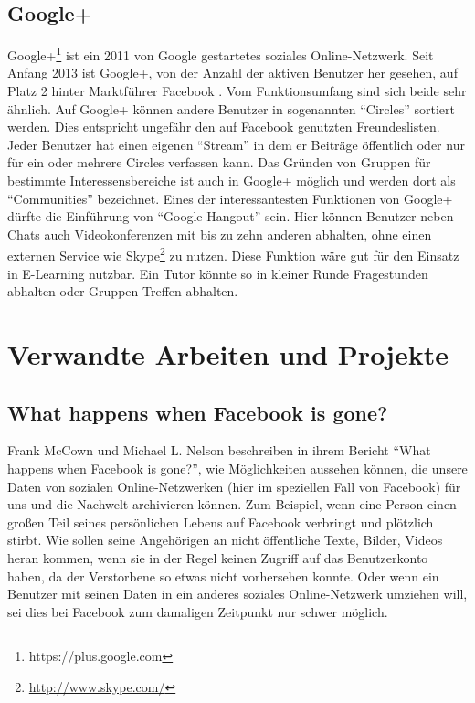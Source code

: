 
\subsection{Google+} %
\label{sub:google_plus}

Google+\footnote{https://plus.google.com} ist ein 2011 von Google gestartetes soziales Online-Netzwerk. Seit Anfang 2013 ist Google+, von der Anzahl der aktiven Benutzer her gesehen, auf Platz 2 hinter Marktführer Facebook \cite{Thomas2013}. Vom Funktionsumfang sind sich beide sehr ähnlich. Auf Google+ können andere Benutzer in sogenannten \enquote{Circles} sortiert werden. Dies entspricht ungefähr den auf Facebook genutzten Freundeslisten. Jeder Benutzer hat einen eigenen \enquote{Stream} in dem er Beiträge öffentlich oder nur für ein oder mehrere Circles verfassen kann. Das Gründen von Gruppen für bestimmte Interessensbereiche ist auch in Google+ möglich und werden dort als \enquote{Communities} bezeichnet. Eines der interessantesten Funktionen von Google+ dürfte die Einführung von \enquote{Google Hangout} sein. Hier können Benutzer neben Chats auch Videokonferenzen mit bis zu zehn anderen abhalten, ohne einen externen Service wie Skype\footnote{\url{http://www.skype.com/}} zu nutzen. Diese Funktion wäre gut für den Einsatz in E-Learning nutzbar. Ein Tutor könnte so in kleiner Runde Fragestunden abhalten oder Gruppen Treffen abhalten.



\section{Verwandte Arbeiten und Projekte} %
\label{sec:verwandte_arbeiten_und_projekte}


\subsection{What happens when Facebook is gone?} %
\label{sub:what_happens_when_facebook_is_gone}

Frank McCown und Michael L. Nelson beschreiben in ihrem Bericht \enquote{What happens when Facebook is gone?}\cite{McCown2009}, wie Möglichkeiten aussehen können, die unsere Daten von sozialen Online-Netzwerken (hier im speziellen Fall von Facebook) für uns und die Nachwelt archivieren können. Zum Beispiel, wenn eine Person einen großen Teil seines persönlichen Lebens auf Facebook verbringt und plötzlich stirbt. Wie sollen seine Angehörigen an nicht öffentliche Texte, Bilder, Videos heran kommen, wenn sie in der Regel keinen Zugriff auf das Benutzerkonto haben, da der Verstorbene so etwas nicht vorhersehen konnte. Oder wenn ein Benutzer mit seinen Daten in ein anderes soziales Online-Netzwerk umziehen will, sei dies bei Facebook zum damaligen Zeitpunkt nur schwer möglich.

